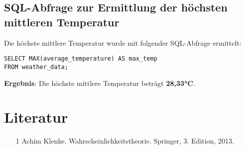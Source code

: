 \documentclass[a4paper,12pt]{article}
\begin{document}
\subsection{SQL-Abfrage zur Ermittlung der höchsten mittleren Temperatur}
Die höchste mittlere Temperatur wurde mit folgender SQL-Abfrage ermittelt:
\begin{verbatim}
SELECT MAX(average_temperature) AS max_temp
FROM weather_data;
\end{verbatim}
\textbf{Ergebnis}: Die höchste mittlere Temperatur beträgt \textbf{28,33°C}.



\section{Literatur}
\begin{itemize}
    \item [1] Achim Klenke. Wahrscheinlichkeitstheorie. Springer, 3. Edition, 2013.
\end{itemize}
\end{document}
